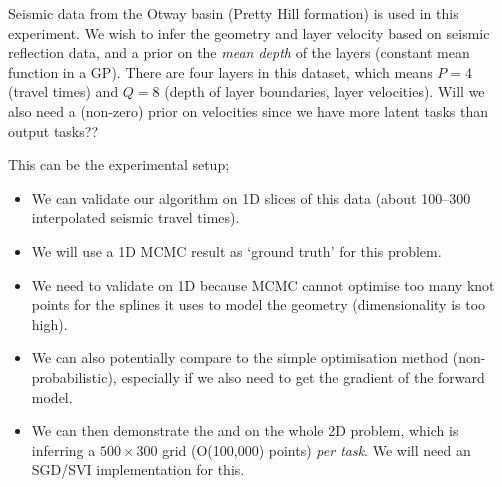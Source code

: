 Seismic data from the Otway basin (Pretty Hill formation) is used in this
experiment. We wish to infer the geometry and layer velocity based on seismic
reflection data, and a prior on the \emph{mean depth} of the layers (constant
mean function in a GP). There are four layers in this dataset, which means $P =
4$ (travel times) and $Q = 8$ (depth of layer boundaries, layer velocities).
Will we also need a (non-zero) prior on velocities since we have more latent
tasks than output tasks??

This can be the experimental setup;
\begin{itemize}
    \item We can validate our algorithm on 1D slices of this data (about
        100--300 interpolated seismic travel times).
    \item We will use a 1D MCMC result as `ground truth' for this problem.
    \item We need to validate on 1D because MCMC cannot optimise too many knot
        points for the splines it uses to model the geometry (dimensionality is
        too high).
    \item We can also potentially compare to the simple optimisation method
        (non-probabilistic), especially if we also need to get the gradient of
        the forward model.
    \item We can then demonstrate the \eks and \uks on the whole 2D problem,
        which is inferring a $500\times300$ grid (O(100,000) points) \emph{per
            task}. We will need an SGD/SVI implementation for this.
\end{itemize}
